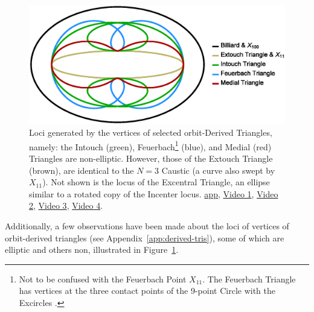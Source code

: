 \begin{figure}
 \begin{minipage}{\textwidth}
    \centering
    \includegraphics[width=.85\textwidth]{pics_1050_non_elliptic.eps}
    \caption[blablabla]{Loci generated by the vertices of selected orbit-Derived Triangles, namely: the Intouch (green), Feuerbach\footnote{Not to be confused with the Feuerbach Point $X_{11}$. The Feuerbach Triangle has vertices at the three contact points of the 9-point Circle with the Excircles \cite{mw}.} (blue), and Medial (red) Triangles are non-elliptic. However, those of the Extouch Triangle (brown), are identical to the $N=3$ Caustic (a curve also swept by $X_{11}$). Not shown is the locus of the Excentral Triangle, an ellipse similar to a rotated copy of the Incenter locus. \href{https://bit.ly/2MMH9e5}{app},
    \href{https://youtu.be/9xU6T7hQMzs}{Video 1}, \href{https://youtu.be/Xxr1DUo19_w}{Video 2}, \href{https://youtu.be/TXdg7tUl8lc}{Video 3}, \href{https://youtu.be/OGvCQbYqJyI}{Video 4}.}
    \label{fig:non-elliptic-vertex}
    \end{minipage}
\end{figure}

Additionally, a few  observations have been made \cite{reznik2020-intelligencer} about the loci of vertices of orbit-derived triangles (see Appendix~\ref{app:derived-tris}), some of which are elliptic and others non, illustrated in Figure~\ref{fig:non-elliptic-vertex}.